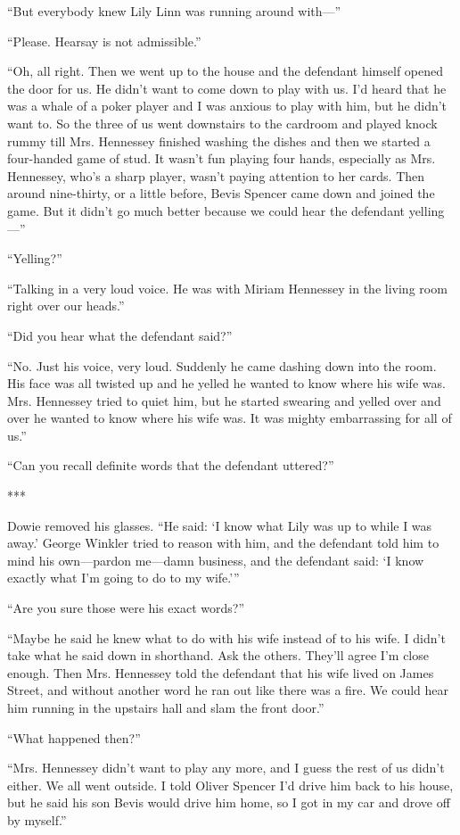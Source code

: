 \documentclass{novel}
\begin{document}
{“But everybody knew Lily Linn was running around with—”

“Please. Hearsay is not admissible.”

“Oh, all right. Then we went up to the house and the defendant himself opened the door for us. He didn’t want to come down to play with us. I’d heard that he was a whale of a poker player and I was anxious to play with him, but he didn’t want to. So the three of us went downstairs to the cardroom and played knock rummy till Mrs. Hennessey finished washing the dishes and then we started a four-handed game of stud. It wasn’t fun playing four hands, especially as Mrs. Hennessey, who’s a sharp player, wasn’t paying attention to her cards. Then around nine-thirty, or a little before, Bevis Spencer came down and joined the game. But it didn’t go much better because we could hear the defendant yelling—”

“Yelling?”

“Talking in a very loud voice. He was with Miriam Hennessey in the living room right over our heads.”

“Did you hear what the defendant said?”

“No. Just his voice, very loud. Suddenly he came dashing down into the room. His face was all twisted up and he yelled he wanted to know where his wife was. Mrs. Hennessey tried to quiet him, but he started swearing and yelled over and over he wanted to know where his wife was. It was mighty embarrassing for all of us.”

“Can you recall definite words that the defendant uttered?”

***

Dowie removed his glasses. “He said: ‘I know what Lily was up to while I was away.’ George Winkler tried to reason with him, and the defendant told him to mind his own—pardon me—damn business, and the defendant said: ‘I know exactly what I’m going to do to my wife.’”

“Are you sure those were his exact words?”

“Maybe he said he knew what to do with his wife instead of to his wife. I didn’t take what he said down in shorthand. Ask the others. They’ll agree I’m close enough. Then Mrs. Hennessey told the defendant that his wife lived on James Street, and without another word he ran out like there was a fire. We could hear him running in the upstairs hall and slam the front door.”

“What happened then?”

“Mrs. Hennessey didn’t want to play any more, and I guess the rest of us didn’t either. We all went outside. I told Oliver Spencer I’d drive him back to his house, but he said his son Bevis would drive him home, so I got in my car and drove off by myself.”

}
\end{document}
